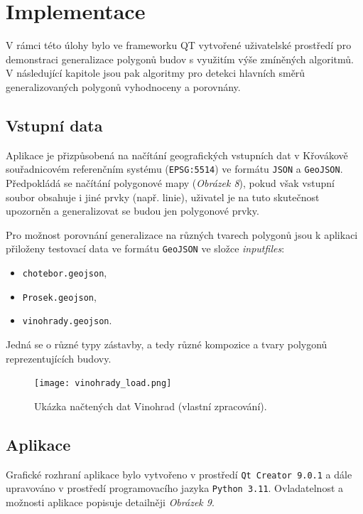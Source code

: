 \chapter*{Implementace}

\par V rámci této úlohy bylo ve frameworku QT vytvořené uživatelské prostředí pro demonstraci generalizace polygonů budov s využitím výše zmíněných algoritmů. V následující kapitole jsou pak algoritmy pro detekci hlavních směrů generalizovaných polygonů vyhodnoceny a porovnány.

\section*{Vstupní data}
\par Aplikace je přizpůsobená na načítání geografických vstupních dat v Křovákově souřadnicovém referenčním systému (\verb|EPSG:5514|) ve formátu \verb|JSON| a \verb|GeoJSON|. Předpokládá se načítání polygonové mapy (\emph{Obrázek 8}), pokud však vstupní soubor obsahuje i jiné prvky (např. linie), uživatel je na tuto skutečnost upozorněn a generalizovat se budou jen polygonové prvky.
\par Pro možnost porovnání generalizace na různých tvarech polygonů jsou k aplikaci přiloženy testovací data ve formátu \verb|GeoJSON| ve složce \emph{input\textunderscore files}:

\begin{itemize}
    \item \verb|chotebor.geojson|,
    \item \verb|Prosek.geojson|,
    \item \verb|vinohrady.geojson|.
\end{itemize}

Jedná se o různé typy zástavby, a tedy různé kompozice a tvary polygonů reprezentujících budovy.

\begin{figure}[h]
\centering
\texttt{[image: vinohrady\_load.png]}
    \caption{Ukázka načtených dat Vinohrad (vlastní zpracování).}
\end{figure}

\bigbreak

\section*{Aplikace}
\par Grafické rozhraní aplikace bylo vytvořeno v prostředí \verb|Qt Creator 9.0.1| a dále upravováno v prostředí programovacího jazyka \verb|Python 3.11|. Ovladatelnost a možnosti aplikace popisuje detailněji \emph{Obrázek 9}.

